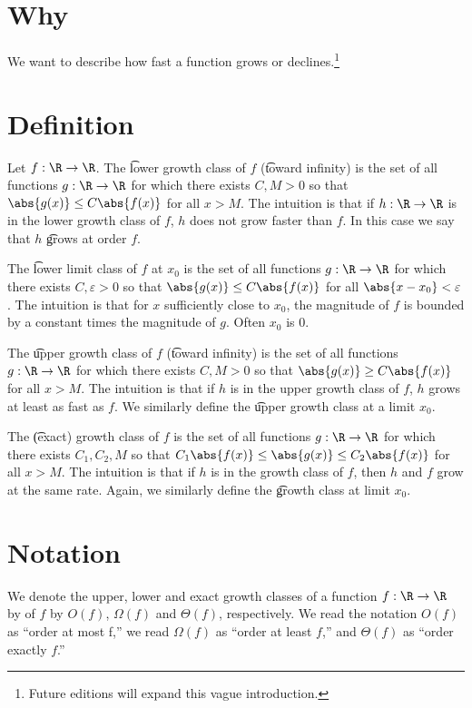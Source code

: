 
\section*{Why}

We want to describe how fast a function grows or declines.\footnote{Future editions will expand this vague introduction.}

\section*{Definition}

Let $f: \R  \to \R $.
The \t{lower growth class} of $f$ (\t{toward infinity}) is the set of all functions $g: \R  \to \R $ for which there exists $C, M > 0$ so that $\abs{g(x)} \leq C\abs{f(x)}$ for all $x > M$.
The intuition is that if $h: \R  \to \R $ is in the lower growth class of $f$, $h$ does not grow faster than $f$.
In this case we say that $h$ \t{grows at order} $f$.

The \t{lower limit class of $f$ at $x_0$} is the set of all functions $g: \R  \to \R $ for which there exists $C, \varepsilon  > 0$ so that $\abs{g(x)} \leq C \abs{f(x)}$ for all $\abs{x - x_0} < \varepsilon $.
The intuition is that for $x$ sufficiently close to $x_0$, the magnitude of $f$ is bounded by a constant times the magnitude of $g$.
Often $x_0$ is $0$.

The \t{upper growth class} of $f$ (\t{toward infinity}) is the set of all functions $g: \R  \to \R $ for which there exists $C, M > 0$ so that $\abs{g(x)} \geq C\abs{f(x)}$ for all $x > M$.
The intuition is that if $h$ is in the upper growth class of $f$, $h$ grows at least as fast as $f$.
We similarly define the \t{upper growth class at a limit $x_0$}.

The \t{(exact) growth class} of $f$ is the set of all functions $g: \R  \to \R $ for which there exists $C_1, C_2, M$ so that $C_1\abs{f(x)} \leq \abs{g(x)} \leq C_2 \abs{f(x)}$ for all $x > M$.
The intuition is that if $h$ is in the growth class of $f$, then $h$ and $f$ grow at the same rate.
Again, we similarly define the \t{growth class at limit $x_0$}.

\section*{Notation}

We denote the upper, lower and exact growth classes of a function $f: \R  \to \R $ by of $f$ by $O(f)$, $\Omega (f)$ and $\Theta (f)$, respectively.
We read the notation $O(f)$ as ``order at most f,'' we read $\Omega (f)$ as ``order at least $f$,'' and $\Theta (f)$ as ``order exactly $f$.''

